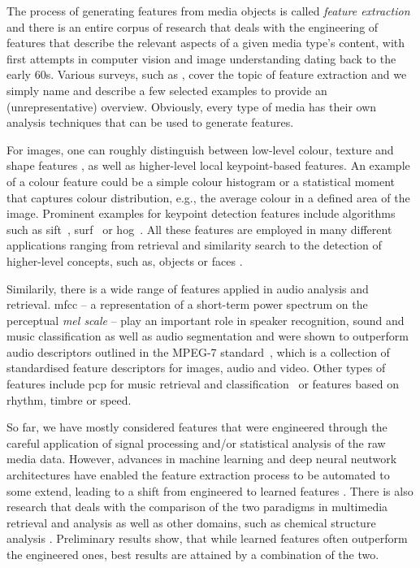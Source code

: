 The process of generating features from media objects is called \emph{feature extraction} \cite{Blanken:2007multimedia} and there is an entire corpus of research that deals with the engineering of features that describe the relevant aspects of a given media type's content, with first attempts in computer vision and image understanding dating back to the early 60s. Various surveys, such as \cite{McKinney:2003Features,Ding:2012ASurvey,Salau:2019Feature}, cover the topic of feature extraction and we simply name and describe a few selected examples to provide an (unrepresentative) overview. Obviously, every type of media has their own analysis techniques that can be used to generate features.

For images, one can roughly distinguish between low-level colour, texture and shape features \cite{Salau:2019Feature}, as well as higher-level local keypoint-based features. An example of a colour feature could be a simple colour histogram or a statistical moment that captures colour distribution, e.g., the average colour in a defined area of the image. Prominent examples for keypoint detection features include algorithms such as \acrfull{sift}~\cite{Lowe:1999object}, \acrfull{surf}~\cite{Bay:2006surf} or \acrfull{hog}~\cite{Dalal:2005Histograms}. All these features are employed in many different applications ranging from retrieval and similarity search to the detection of higher-level concepts, such as, objects or faces \cite{Deniz:2011Face, Farooq:2016Object}.

Similarily, there is a wide range of features applied in audio analysis and retrieval. \acrfull{mfcc} -- a representation of a short-term power spectrum on the perceptual \emph{mel scale} -- play an important role in speaker recognition, sound and music classification as well as audio segmentation \cite{Kim:2010Comparison} and were shown to outperform audio descriptors outlined in the MPEG-7 standard~\cite{Quackenbush:2001Overview}, which is a collection of standardised feature descriptors for images, audio and video. Other types of features include \acrfull{pcp} for music retrieval and classification~\cite{Lee:2006Automatic,Demirel:2019Automatic} or features based on rhythm, timbre or speed. 

So far, we have mostly considered features that were engineered through the careful application of signal processing and/or statistical analysis of the raw media data. However, advances in machine learning and deep neural neutwork architectures have enabled the feature extraction process to be automated to some extend, leading to a shift from  engineered to learned features \cite{Hamel:2010Learning,Gordo:2016Deep}. There is also research that deals with the comparison of the two paradigms in multimedia retrieval and analysis \cite{Budnik:2017learned} as well as other domains, such as chemical structure analysis \cite{Gallegos:2021importance}. Preliminary results show, that while learned features often outperform the engineered ones, best results are attained by a combination of the two.

